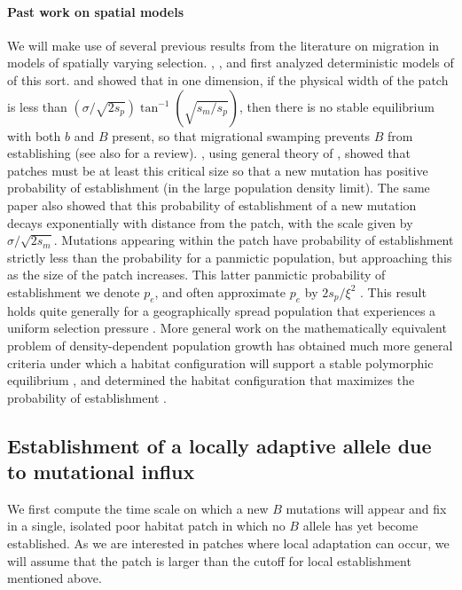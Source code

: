 \documentclass{article}
\newcommand{\citep}[1]{\cite{#1}}
\newcommand{\citet}[1]{\cite{#1}}
\begin{document}
\paragraph{Past work on spatial models}
We will make use of several previous results from the literature on
migration in models of spatially varying selection.
\citet{haldane1948theory}, \citet{fisher1950frequencies}, and \citet{slatkin1973geneflow} first analyzed
deterministic models of of this sort.
\citet{nagylaki1975conditions} and \citet{conley1975application} showed that in one dimension, if the physical width of the patch is less than $(\sigma/\sqrt{2s_p}) \tan^{-1} (\sqrt{s_m/s_p})$, 
then there is no stable equilibrium with both $b$ and $B$ present,  %
so that migrational swamping prevents $B$ from establishing (see also \citet{lenormand2002limits} for a review).
\citet{barton1987establishment}, using general theory of \citet{pollak1966survival}, showed  
that patches must be at least this critical size so that a new mutation has positive probability of establishment
(in the large population density limit).
The same paper also showed that
this probability of establishment of a new mutation decays exponentially with distance from the patch, 
with the scale given by $\sigma/\sqrt{2s_m}$. 
Mutations appearing within the patch have probability of establishment
strictly less than the probability for a panmictic population,
but approaching this as the size of the patch increases.
This latter panmictic probability of establishment we denote $p_e$,
and often approximate $p_e$ by $2 s_p / \xi^2$ \citep{haldane1927mathematical,fisher1930genetical}.
This result holds quite generally for a geographically spread population that experiences a uniform selection
pressure \citep{maruyama1970fixation,cherry2003diffusion}. 
More general work on the mathematically equivalent problem of density-dependent population growth 
has obtained much more general criteria
under which a habitat configuration will support a stable polymorphic equilibrium \citep{cantrell1989diffusive},
and determined the habitat configuration that maximizes the probability of establishment \citep{lou2006minimization}.


\subsection[Establishment by Mutation]{Establishment of a locally adaptive allele due to mutational influx}
\label{ss:patchymutation}

We first compute the time scale on which a new $B$ mutations will appear and fix in 
a single, isolated poor habitat patch in which no $B$ allele has yet become established. 
As we are interested in patches where local adaptation can occur,
we will assume that the patch is larger than the cutoff for local establishment 
mentioned above.
\end{document}
